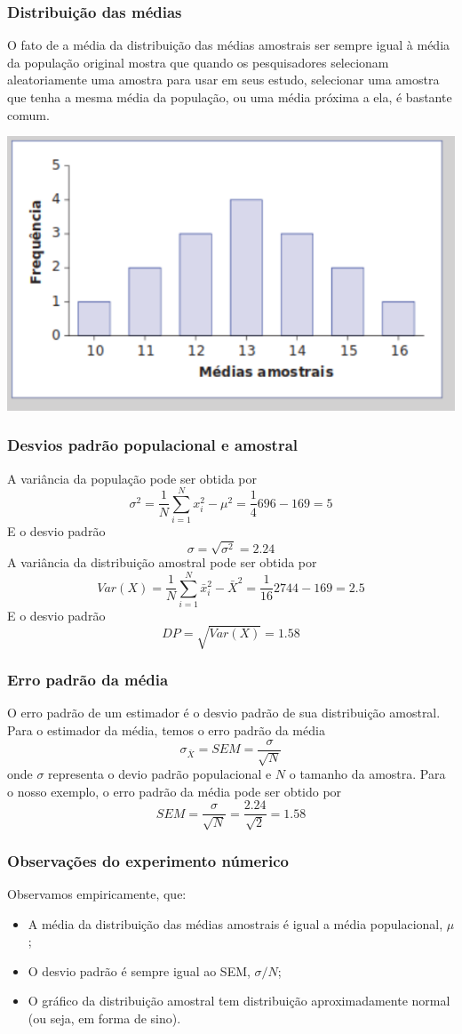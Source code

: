 \documentclass[11pt]{beamer}
\begin{document}
\begin{frame}
\frametitle{Distribuição das médias}
O fato de a média da distribuição das médias amostrais ser sempre igual à média da população original mostra que quando os pesquisadores selecionam aleatoriamente uma amostra para usar em seus estudo, selecionar uma amostra que tenha a mesma média da população, ou uma média próxima a ela, é bastante comum.
\begin{center}\includegraphics[width=0.6\linewidth]{figs/chap5fig5.1} \end{center}

\end{frame}

\begin{frame}
\frametitle{Desvios padrão populacional e amostral}
A variância da população pode ser obtida por
\[\sigma^2 = \frac{1}{N}\sum_{i=1}^N x_i^2 - \mu^2=\frac{1}{4}696-169=5\]
E o desvio padrão
\[\sigma= \sqrt{\sigma^2} = 2.24\]
A variância da distribuição amostral pode ser obtida por
\[Var(X) = \frac{1}{N}\sum_{i=1}^N \bar{x}_i^2 - \bar{X}^2=\frac{1}{16}2744-169=2.5\]
E o desvio padrão
\[DP = \sqrt{Var(X)} = 1.58\]
\end{frame}

\begin{frame}
\frametitle{Erro padrão da média}
O erro padrão de um estimador é o desvio padrão de sua distribuição amostral. Para o estimador da média, temos o erro padrão da média
\[\sigma_{\bar{X}} = SEM = \frac{\sigma}{\sqrt{N}}\]
onde \(\sigma\) representa o devio padrão populacional e \(N\) o tamanho da amostra.
Para o nosso exemplo, o erro padrão da média pode ser obtido por
\[SEM = \frac{\sigma}{\sqrt{N}} = \frac{2.24}{\sqrt{2}}=1.58\]

\end{frame}

\begin{frame}
\frametitle{Observações do experimento númerico}
Observamos empiricamente, que:
\begin{itemize}
\item A média da distribuição das médias amostrais é igual a média populacional, \(\mu\);
\item O desvio padrão é sempre igual ao SEM, \(\sigma/N\);
\item O gráfico da distribuição amostral tem distribuição aproximadamente normal (ou seja, em forma de sino).
\end{itemize}

\end{frame}
\end{document}
